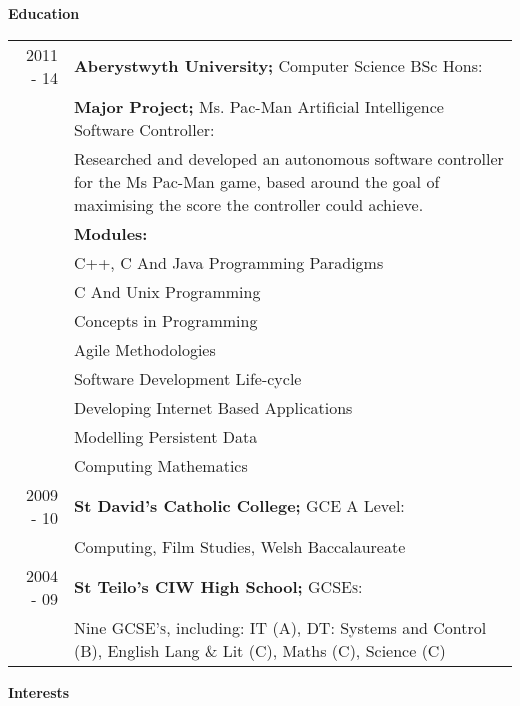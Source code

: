 \documentclass[a4paper,12pt,final,sans]{memoir}
\begin{document}
\textbf{\textsf{\color{head} \large{Education} }}\\[-1.5em]
\begin{longtable}{r p{16cm}}
2011 - 14 & \textbf{\textsf{\color{head} Aberystwyth University;}} Computer Science BSc Hons:\\[0.3em]
		& \textbf{\color{subhead} Major Project;} Ms. Pac-Man Artificial Intelligence Software Controller:\\
		& Researched and developed an autonomous software controller for the Ms Pac-Man game, based around the goal of maximising the score the controller could achieve. \\[0.2em]

		& \textbf{\color{subhead} Modules:}\\ 
		& \textsc{C++}, C And Java Programming Paradigms
		{}\\

		& C And Unix Programming
		{}\\

		& Concepts in Programming
		{}\\

		& Agile Methodologies
		{}\\

		& Software Development Life-cycle
		{}\\

		& Developing Internet Based Applications
		{}\\

		& Modelling Persistent Data
		{}\\

		& Computing Mathematics
		{}\\[0.5em]

2009 - 10 & \textbf{\textsf{\color{head} St David's Catholic College;}} GCE A Level:\\[0.3em]
		& Computing, Film Studies, Welsh Baccalaureate\\[0.5em]

2004 - 09 & \textbf{\textsf{\color{head} St Teilo's CIW High School;}} \textsc{GCSEs:}\\[0.3em]
	 & Nine \textsc{GCSE's}, including: \textsc{IT} (A), \textsc{DT}: Systems and Control (B), English Lang \& Lit (C), Maths (C), Science (C)
\end{longtable}

\vspace{1mm}
\textbf{\textsf{\color{head} \large{Interests} }} \\[-0.7em]
\end{document}
